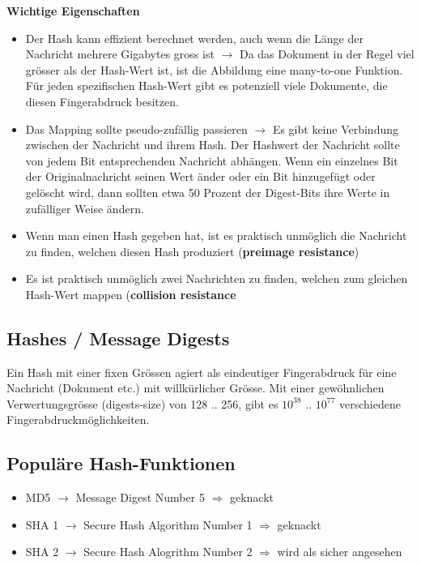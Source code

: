 \documentclass{report}
\theoremstyle{definition}
\theoremstyle{example}
\begin{document}
\textbf{Wichtige Eigenschaften}\\
\begin{itemize}
	\item Der Hash kann effizient berechnet werden, auch wenn die Länge der Nachricht mehrere Gigabytes gross ist $\rightarrow$ Da das Dokument in der Regel viel grösser als der Hash-Wert ist, ist die Abbildung eine many-to-one Funktion. Für jeden spezifischen Hash-Wert gibt es potenziell viele Dokumente, die diesen Fingerabdruck besitzen. 
	\item Das Mapping sollte pseudo-zufällig passieren $\rightarrow$ Es gibt keine Verbindung zwischen der Nachricht und ihrem Hash. Der Hashwert der Nachricht sollte von jedem Bit entsprechenden Nachricht abhängen. Wenn ein einzelnes Bit der Originalnachricht seinen Wert änder oder ein Bit hinzugefügt oder gelöscht wird, dann sollten etwa 50 Prozent der Digest-Bits ihre Werte in zufälliger Weise ändern.
	\item Wenn man einen Hash gegeben hat, ist es praktisch unmöglich die Nachricht zu finden, welchen diesen Hash produziert (\textbf{preimage resistance})
	\item Es ist praktisch unmöglich zwei Nachrichten zu finden, welchen zum gleichen Hash-Wert mappen (\textbf{collision resistance}
\end{itemize}

	\subsection{Hashes / Message Digests}
Ein Hash mit einer fixen Grössen agiert als eindeutiger Fingerabdruck für eine Nachricht (Dokument etc.) mit willkürlicher Grösse. Mit einer gewöhnlichen Verwertungsgrösse (digests-size) von 128 .. 256, gibt es $10^{38}$ .. $10^{77}$ verschiedene Fingerabdruckmöglichkeiten. 

	\subsection{Populäre Hash-Funktionen}
\begin{itemize}
	\item MD5 $\rightarrow$ Message Digest Number 5 $\Rightarrow$ geknackt
	\item SHA 1 $\rightarrow$ Secure Hash Algorithm Number 1 $\Rightarrow$ geknackt
	\item SHA 2 $\rightarrow$ Secure Hash Alogrithm Number 2 $\Rightarrow$ wird als sicher angesehen
\end{itemize}
\end{document}
